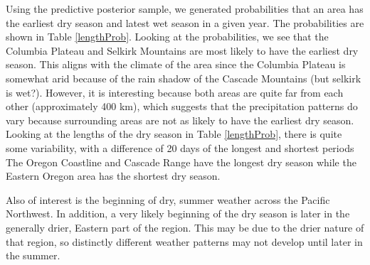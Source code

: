 \documentclass{article}
\begin{document}
Using the predictive posterior sample, we generated probabilities that an area has the earliest dry season and latest wet season in a given year. The probabilities are shown in Table \ref{lengthProb}. Looking at the probabilities, we see that the Columbia Plateau and Selkirk Mountains are most likely to have the earliest dry season. This aligns with the climate of the area since the Columbia Plateau is somewhat arid because of the rain shadow of the Cascade Mountains (but selkirk is wet?). However, it is interesting because both areas are quite far from each other (approximately 400 km), which suggests that the precipitation patterns do vary because surrounding areas are not as likely to have the earliest dry season. Looking at the lengths of the dry season in Table \ref{lengthProb}, there is quite some variability, with a difference of 20 days of the longest and shortest periods The Oregon Coastline and Cascade Range have the longest dry season while the Eastern Oregon area has the shortest dry season. %

Also of interest is the beginning of dry, summer weather across the Pacific Northwest. %
In addition, a very likely beginning of the dry season is later in the generally drier, Eastern part of the region. This may be due to the drier nature of that region, so distinctly different weather patterns may not develop until later in the summer. 

\end{document}
